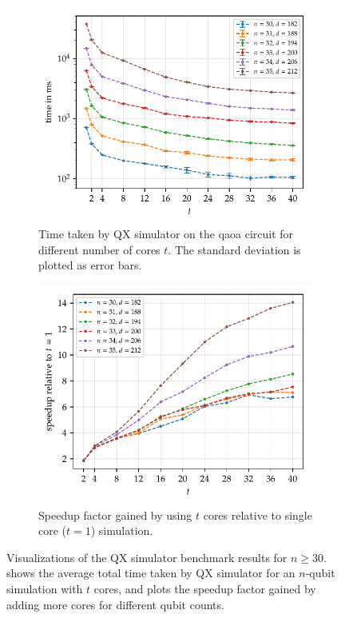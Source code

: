 \clearpage

\begin{figure}[ht]
    \centering
    \begin{subfigure}{.9458\textwidth}
        \centering
        \includegraphics[width=0.835\linewidth]{figures/qx_benchmark_plot.pdf}
        \caption[Time taken by QX simulator on the \gls{qaoa} circuit for different number of cores $t$.]{
            Time taken by QX simulator on the \gls{qaoa} circuit for different number of cores $t$.
            The standard deviation is plotted as error bars.
        }
    \label{fig:qx-benchmark-plot}
    \end{subfigure}
    \begin{subfigure}{.9458\textwidth}
        \centering
        \includegraphics[width=0.835\linewidth]{figures/qx_benchmark_speedup_plot.pdf}
        \caption{
            Speedup factor gained by using $t$ cores relative to single core ($t = 1$) simulation.
        }
        \label{fig:qx-speedup-plot}
    \end{subfigure}
    \caption[Visualizations of the QX simulator benchmark results for $n \ge 30$.]{
        Visualizations of the QX simulator benchmark results for $n \ge 30$.
         shows the average total time taken by QX simulator for an $n$-qubit simulation with $t$ cores, and  plots the speedup factor gained by adding more cores for different qubit counts.
    }
\end{figure}

